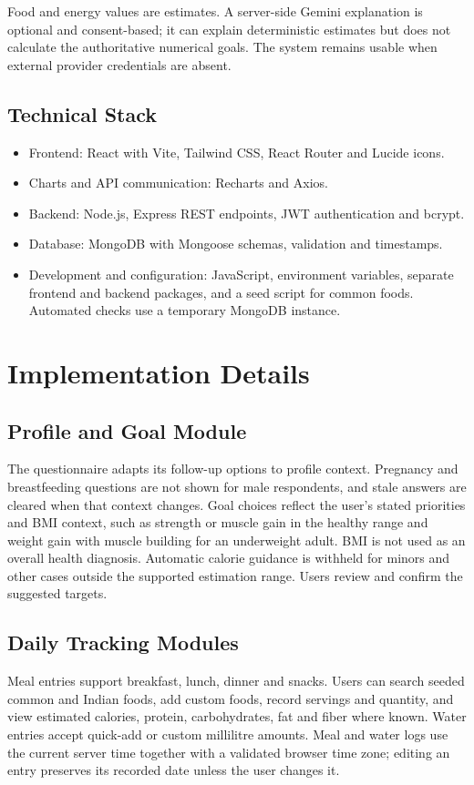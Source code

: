 \documentclass[10pt,a4paper,openany]{report}
\begin{document}
Food and energy values are estimates. A server-side Gemini explanation is optional and consent-based; it can explain deterministic estimates but does not calculate the authoritative numerical goals. The system remains usable when external provider credentials are absent.

\subsection{Technical Stack}
\begin{itemize}
\item Frontend: React with Vite, Tailwind CSS, React Router and Lucide icons.
\item Charts and API communication: Recharts and Axios.
\item Backend: Node.js, Express REST endpoints, JWT authentication and bcrypt.
\item Database: MongoDB with Mongoose schemas, validation and timestamps.
\end{itemize}
\clearpage

\begin{itemize}
\item Development and configuration: JavaScript, environment variables, separate frontend and backend packages, and a seed script for common foods. Automated checks use a temporary MongoDB instance.
\end{itemize}

\section{Implementation Details}
\subsection{Profile and Goal Module}
The questionnaire adapts its follow-up options to profile context. Pregnancy and breastfeeding questions are not shown for male respondents, and stale answers are cleared when that context changes. Goal choices reflect the user's stated priorities and BMI context, such as strength or muscle gain in the healthy range and weight gain with muscle building for an underweight adult. BMI is not used as an overall health diagnosis. Automatic calorie guidance is withheld for minors and other cases outside the supported estimation range. Users review and confirm the suggested targets.

\subsection{Daily Tracking Modules}
Meal entries support breakfast, lunch, dinner and snacks. Users can search seeded common and Indian foods, add custom foods, record servings and quantity, and view estimated calories, protein, carbohydrates, fat and fiber where known. Water entries accept quick-add or custom millilitre amounts. Meal and water logs use the current server time together with a validated browser time zone; editing an entry preserves its recorded date unless the user changes it.
\end{document}
